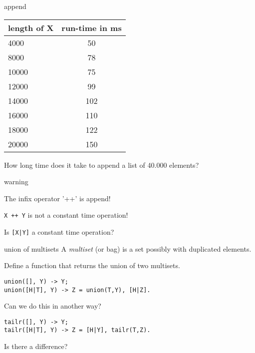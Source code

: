 \begin{frame}{append}

\begin{tabular}{|l|c|}
\hline
length of X & run-time in ms\\
\hline
  4000  &     50 \\
  8000  &     78 \\
 10000  &     75 \\
 12000  &     99 \\
 14000  &    102 \\
 16000  &    110 \\
 18000  &    122 \\
 20000  &    150 \\
\hline
\end{tabular}


\pause \vspace{20pt}How long time does it take to append a list of 40.000 elements?

\end{frame}

\begin{frame}{warning}

\pause The infix operator '++' is append! 

\pause\vspace{20pt} {\tt X ++ Y} is not a constant time operation!

\pause\vspace{20pt} Is {\tt [X|Y]} a constant time operation?

\end{frame}



\begin{frame}[fragile]{union of multisets}
A {\em multiset} (or bag) is a set possibly with duplicated elements.

\pause \vspace{20pt} Define a function that returns the union of two multisets.
\pause

\begin{verbatim}
union([], Y) -> Y;
union([H|T], Y) -> Z = union(T,Y), [H|Z].
\end{verbatim}

\pause \vspace{20pt} Can we do this in another way?

\pause
\begin{verbatim}
tailr([], Y) -> Y;
tailr([H|T], Y) -> Z = [H|Y], tailr(T,Z).
\end{verbatim}

\pause\vspace{20pt} Is there a difference?

\end{frame}

